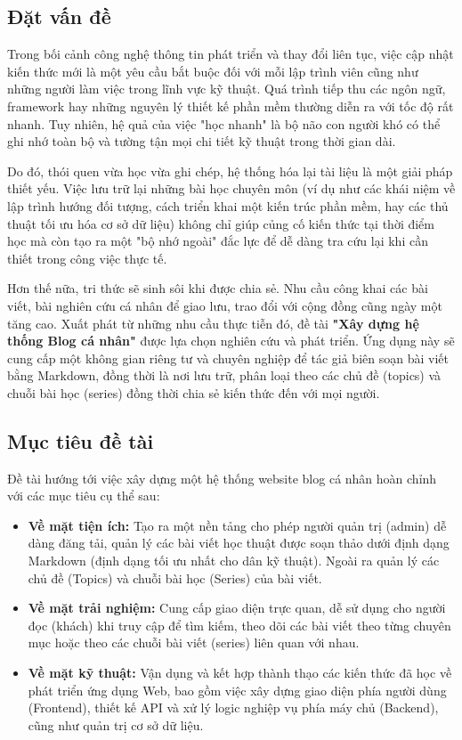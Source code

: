 \documentclass[a4paper,12pt]{article}
\begin{document}
\subsection{Đặt vấn đề}
Trong bối cảnh công nghệ thông tin phát triển và thay đổi liên tục, việc cập nhật kiến thức mới là một yêu cầu bắt buộc đối với mỗi lập trình viên cũng như những người làm việc trong lĩnh vực kỹ thuật. Quá trình tiếp thu các ngôn ngữ, framework hay những nguyên lý thiết kế phần mềm thường diễn ra với tốc độ rất nhanh. Tuy nhiên, hệ quả của việc "học nhanh" là bộ não con người khó có thể ghi nhớ toàn bộ và tường tận mọi chi tiết kỹ thuật trong thời gian dài.

Do đó, thói quen vừa học vừa ghi chép, hệ thống hóa lại tài liệu là một giải pháp thiết yếu. Việc lưu trữ lại những bài học chuyên môn (ví dụ như các khái niệm về lập trình hướng đối tượng, cách triển khai một kiến trúc phần mềm, hay các thủ thuật tối ưu hóa cơ sở dữ liệu) không chỉ giúp củng cố kiến thức tại thời điểm học mà còn tạo ra một "bộ nhớ ngoài" đắc lực để dễ dàng tra cứu lại khi cần thiết trong công việc thực tế.

Hơn thế nữa, tri thức sẽ sinh sôi khi được chia sẻ. Nhu cầu công khai các bài viết, bài nghiên cứu cá nhân để giao lưu, trao đổi với cộng đồng cũng ngày một tăng cao. Xuất phát từ những nhu cầu thực tiễn đó, đề tài \textbf{"Xây dựng hệ thống Blog cá nhân"} được lựa chọn nghiên cứu và phát triển. Ứng dụng này sẽ cung cấp một không gian riêng tư và chuyên nghiệp để tác giả biên soạn bài viết bằng Markdown, đồng thời là nơi lưu trữ, phân loại theo các chủ đề (topics) và chuỗi bài học (series) đồng thời chia sẻ kiến thức đến với mọi người.

\subsection{Mục tiêu đề tài}
Đề tài hướng tới việc xây dựng một hệ thống website blog cá nhân hoàn chỉnh với các mục tiêu cụ thể sau:

\begin{itemize}
    \item \textbf{Về mặt tiện ích:} Tạo ra một nền tảng cho phép người quản trị (admin) dễ dàng đăng tải, quản lý các bài viết học thuật được soạn thảo dưới định dạng Markdown (định dạng tối ưu nhất cho dân kỹ thuật). Ngoài ra quản lý các chủ đề (Topics) và chuỗi bài học (Series) của bài viết.
    \item \textbf{Về mặt trải nghiệm:} Cung cấp giao diện trực quan, dễ sử dụng cho người đọc (khách) khi truy cập để tìm kiếm, theo dõi các bài viết theo từng chuyên mục hoặc theo các chuỗi bài viết (series) liên quan với nhau.
    \item \textbf{Về mặt kỹ thuật:} Vận dụng và kết hợp thành thạo các kiến thức đã học về phát triển ứng dụng Web, bao gồm việc xây dựng giao diện phía người dùng (Frontend), thiết kế API và xử lý logic nghiệp vụ phía máy chủ (Backend), cũng như quản trị cơ sở dữ liệu.
\end{itemize}
\end{document}
